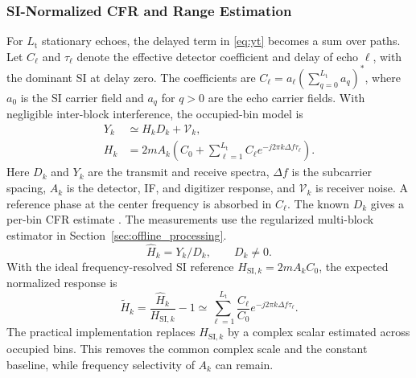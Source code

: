 \documentclass[10pt,journal]{IEEEtran}
\DeclareRobustCommand{\rev}[1]{\textcolor{revisioncolor}{#1}}
\begin{document}
\subsubsection{SI-Normalized CFR and Range Estimation}
\label{sec:range_est}

\rev{For \(L_{\mathrm t}\) stationary echoes, the delayed term in
\eqref{eq:yt} becomes a sum over paths. Let \(C_\ell\) and
\(\tau_\ell\) denote the effective detector coefficient and
delay of echo \(\ell\), with the dominant SI at delay zero. The
coefficients are \(C_\ell=a_\ell(\sum_{q=0}^{L_{\mathrm t}}a_q)^*\),
where \(a_0\) is the SI carrier field and \(a_q\) for \(q>0\)
are the echo carrier fields. With negligible inter-block
interference, the occupied-bin model is}
{\color{revisioncolor}
\begin{equation}
\begin{split}
Y_k &\simeq H_kD_k+\mathcal V_k,\\
H_k &=2mA_k\!\left(C_0+
   \sum_{\ell=1}^{L_{\mathrm t}} C_\ell e^{-j2\pi k\Delta f\tau_\ell}
              \right).
\end{split}
\label{eq:Yk}
\end{equation}}
\rev{Here \(D_k\) and \(Y_k\) are the transmit and receive spectra,
\(\Delta f\) is the subcarrier spacing, \(A_k\) is the detector,
IF, and digitizer response, and \(\mathcal V_k\) is receiver noise.
A reference phase at the center frequency is absorbed in \(C_\ell\).
The known \(D_k\) gives a per-bin CFR estimate
\cite{sturm_waveform_2011}. The measurements use the regularized
multi-block estimator in Section~\ref{sec:offline_processing}.}
{\color{revisioncolor}
\begin{equation}
\widehat H_k=Y_k/D_k,\qquad D_k\ne0.
\label{eq:cfr}
\end{equation}}
\rev{With the ideal frequency-resolved SI reference
\(H_{\mathrm{SI},k}=2mA_kC_0\), the expected normalized
response is}
{\color{revisioncolor}
\begin{equation}
\widetilde H_k=\frac{\widehat H_k}{H_{\mathrm{SI},k}}-1
\simeq \sum_{\ell=1}^{L_{\mathrm t}}
\frac{C_\ell}{C_0}e^{-j2\pi k\Delta f\tau_\ell}.
\label{eq:sinorm}
\end{equation}}
\rev{The practical implementation replaces \(H_{\mathrm{SI},k}\) by a
complex scalar estimated across occupied bins. This removes the
common complex scale and the constant baseline, while frequency
selectivity of \(A_k\) can remain.}
\end{document}
